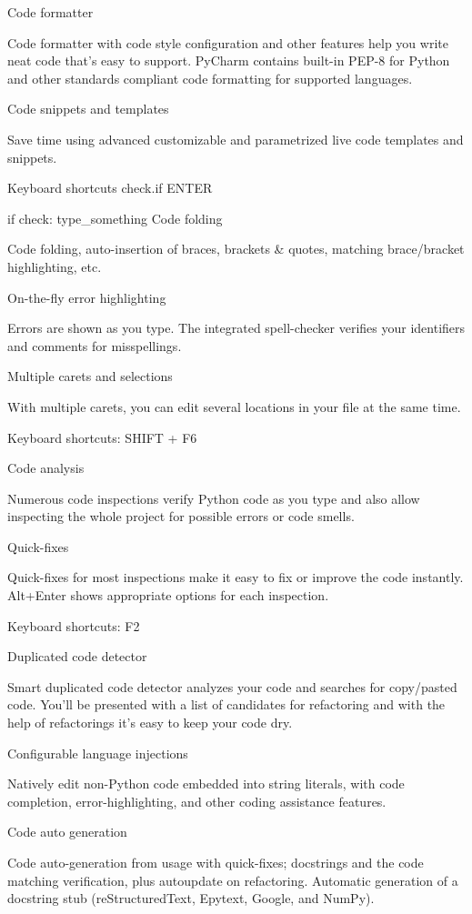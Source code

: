 Code formatter

Code formatter with code style configuration and other features help you write neat code that's easy to support. PyCharm contains built-in PEP-8 for Python and other standards compliant code formatting for supported languages.

Code snippets and templates

Save time using advanced customizable and parametrized live code templates and snippets.

Keyboard shortcuts check.if ENTER

if check:
  type_something
Code folding

Code folding, auto-insertion of braces, brackets & quotes, matching brace/bracket highlighting, etc.

On-the-fly error highlighting

Errors are shown as you type. The integrated spell-checker verifies your identifiers and comments for misspellings.

Multiple carets and selections

With multiple carets, you can edit several locations in your file at the same time.

Keyboard shortcuts: SHIFT + F6

Code analysis

Numerous code inspections verify Python code as you type and also allow inspecting the whole project for possible errors or code smells.

Quick-fixes

Quick-fixes for most inspections make it easy to fix or improve the code instantly. Alt+Enter shows appropriate options for each inspection.

Keyboard shortcuts: F2

Duplicated code detector

Smart duplicated code detector analyzes your code and searches for copy/pasted code. You'll be presented with a list of candidates for refactoring and with the help of refactorings it's easy to keep your code dry.

Configurable language injections

Natively edit non-Python code embedded into string literals, with code completion, error-highlighting, and other coding assistance features.

Code auto generation

Code auto-generation from usage with quick-fixes; docstrings and the code matching verification, plus autoupdate on refactoring. Automatic generation of a docstring stub (reStructuredText, Epytext, Google, and NumPy).

